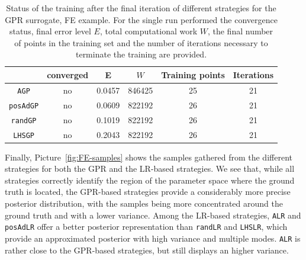 \begin{table}[H]
    \begin{centering}
    \begin{tabular}{cccccc}
    \toprule
        & converged   & E & $W$ & Training points    & Iterations \\ 
        \midrule
        \texttt{AGP}  
        & no & 0.0457 & 846425 &  25   &  21  \\
        \texttt{posAdGP}
        & no & 0.0609 & 822192 &  26   &  21 \\
        \texttt{randGP}
        & no & 0.1019 & 822192 &  26   &  21 \\
        \texttt{LHSGP}
        & no & 0.2043 & 822192 &  26   &  21 \\
    \bottomrule
    \end{tabular}
    \caption{Status of the training after the final iteration of different strategies for the GPR surrogate, FE example. For the single run performed the convergence status, final error level $E$, total computational work $W$, the final number of points in the training set and the number of iterations necessary to terminate the training are provided.
    }
    \label{tab:FE-LR-recap}
\end{centering}
\end{table} 

Finally, Picture~\ref{fig:FE-samples} shows the samples gathered from the different strategies for both the GPR and the LR-based strategies.
We see that, while all strategies correctly identify the region of the parameter space where the ground truth is located, the GPR-based strategies provide a considerably more precise posterior distribution, with the samples being more concentrated around the ground truth and with a lower variance.
Among the LR-based strategies, \texttt{ALR} and \texttt{posAdLR} offer a better posterior representation than \texttt{randLR} and \texttt{LHSLR}, which provide an approximated posterior with high variance and multiple modes. 
\texttt{ALR} is rather close to the GPR-based strategies, but still displays an higher variance.

